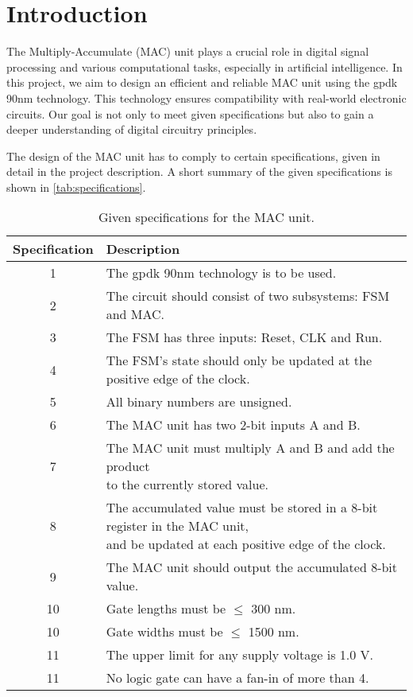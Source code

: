\section{Introduction}
\label{sec:introduction}

The Multiply-Accumulate (MAC) unit plays a crucial role in digital signal processing and various computational tasks, especially in artificial intelligence. In this project, we aim to design an efficient and reliable MAC unit using the gpdk 90nm technology. This technology ensures compatibility with real-world electronic circuits. Our goal is not only to meet given specifications but also to gain a deeper understanding of digital circuitry principles. 

The design of the MAC unit has to comply to certain specifications, given in detail in the project description\cite{project_description}. A short summary of the given specifications is shown in \autoref{tab:specifications}.

\begin{table}[H]
\caption{Given specifications for the MAC unit.}
\label{tab:specifications}
\centering
\begin{tabular}{|c|l|}
\hline
\rowcolor[HTML]{C0C0C0} 
 Specification & Description \\ \hline
 1 & The gpdk 90nm technology is to be used. \\ \hline
 2 & The circuit should consist of two subsystems: FSM and MAC. \\ \hline
 3 & The FSM has three inputs: Reset, CLK and Run.  \\ \hline
 4 & The FSM’s state should only be updated at the positive edge of the clock. \\ \hline
 5 & All binary numbers are unsigned. \\ \hline
 6 & The MAC unit has two 2-bit inputs A and B. \\ \hline
 7 & \makecell[l]{The MAC unit must multiply A and B and add the product\\ to the currently stored value.}  \\ \hline
 8 & \makecell[l]{The accumulated value must be stored in a 8-bit register in the MAC unit,\\ and be updated at each positive edge of the clock.} \\ \hline
 9 & The MAC unit should output the accumulated 8-bit value. \\ \hline
 10 & Gate lengths must be $\le$ 300 nm. \\ \hline
 10 & Gate widths must be $\le$ 1500 nm. \\ \hline
 11 & The upper limit for any supply voltage is 1.0 V. \\ \hline
 11 & No logic gate can have a fan-in of more than 4. \\ \hline
\end{tabular}
\end{table}

